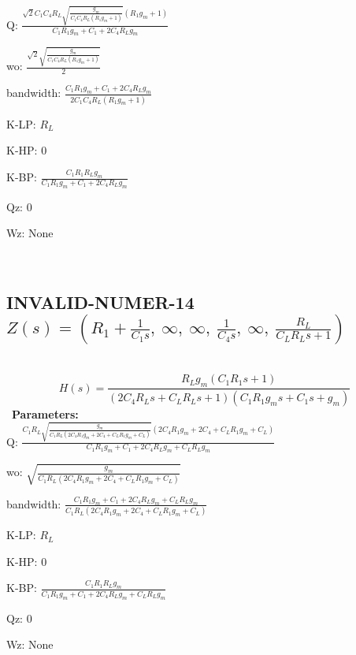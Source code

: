 \documentclass{article}
\begin{document}
Q: $\frac{\sqrt{2} C_{1} C_{4} R_{L} \sqrt{\frac{g_{m}}{C_{1} C_{4} R_{L} \left(R_{1} g_{m} + 1\right)}} \left(R_{1} g_{m} + 1\right)}{C_{1} R_{1} g_{m} + C_{1} + 2 C_{4} R_{L} g_{m}}$\ 

wo: $\frac{\sqrt{2} \sqrt{\frac{g_{m}}{C_{1} C_{4} R_{L} \left(R_{1} g_{m} + 1\right)}}}{2}$\ 

bandwidth: $\frac{C_{1} R_{1} g_{m} + C_{1} + 2 C_{4} R_{L} g_{m}}{2 C_{1} C_{4} R_{L} \left(R_{1} g_{m} + 1\right)}$\ 

K-LP: $R_{L}$\ 

K-HP: $0$\ 

K-BP: $\frac{C_{1} R_{1} R_{L} g_{m}}{C_{1} R_{1} g_{m} + C_{1} + 2 C_{4} R_{L} g_{m}}$\ 

Qz: $0$\ 

Wz: $\text{None}$\ 

\ 

\subsection{INVALID-NUMER-14 $Z(s) = \left( R_{1} + \frac{1}{C_{1} s}, \  \infty, \  \infty, \  \frac{1}{C_{4} s}, \  \infty, \  \frac{R_{L}}{C_{L} R_{L} s + 1}\right)$ } \ 
\textbf{\[H(s) = \frac{R_{L} g_{m} \left(C_{1} R_{1} s + 1\right)}{\left(2 C_{4} R_{L} s + C_{L} R_{L} s + 1\right) \left(C_{1} R_{1} g_{m} s + C_{1} s + g_{m}\right)}\] } \ 
\textbf{Parameters:}\\ 

Q: $\frac{C_{1} R_{L} \sqrt{\frac{g_{m}}{C_{1} R_{L} \left(2 C_{4} R_{1} g_{m} + 2 C_{4} + C_{L} R_{1} g_{m} + C_{L}\right)}} \left(2 C_{4} R_{1} g_{m} + 2 C_{4} + C_{L} R_{1} g_{m} + C_{L}\right)}{C_{1} R_{1} g_{m} + C_{1} + 2 C_{4} R_{L} g_{m} + C_{L} R_{L} g_{m}}$\ 

wo: $\sqrt{\frac{g_{m}}{C_{1} R_{L} \left(2 C_{4} R_{1} g_{m} + 2 C_{4} + C_{L} R_{1} g_{m} + C_{L}\right)}}$\ 

bandwidth: $\frac{C_{1} R_{1} g_{m} + C_{1} + 2 C_{4} R_{L} g_{m} + C_{L} R_{L} g_{m}}{C_{1} R_{L} \left(2 C_{4} R_{1} g_{m} + 2 C_{4} + C_{L} R_{1} g_{m} + C_{L}\right)}$\ 

K-LP: $R_{L}$\ 

K-HP: $0$\ 

K-BP: $\frac{C_{1} R_{1} R_{L} g_{m}}{C_{1} R_{1} g_{m} + C_{1} + 2 C_{4} R_{L} g_{m} + C_{L} R_{L} g_{m}}$\ 

Qz: $0$\ 

Wz: $\text{None}$\ 

\ 
\end{document}

